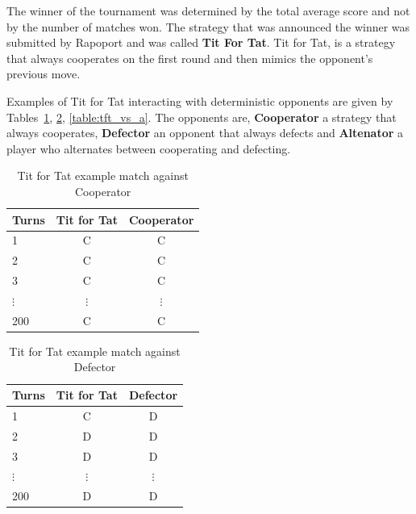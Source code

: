 \documentclass{article}
\begin{document}
The winner of the tournament was determined by the total average score and not by
the number of matches won. The strategy that was announced the winner was
submitted by Rapoport and was called \textbf{Tit For Tat}. Tit for Tat, is a 
strategy that always cooperates on the first round and then mimics the opponent's
previous move. 

Examples of Tit for Tat interacting with deterministic opponents are given by 
Tables~\ref{table:tft_vs_c}, \ref{table:tft_vs_d}, \ref{table:tft_vs_a}. 
The opponents are, \textbf{Cooperator} a strategy that always cooperates, 
\textbf{Defector} an opponent that always defects and \textbf{Altenator} a 
player who alternates between cooperating and defecting.

\begin{table}[!hbtp]
    \begin{center}
    \begin{tabular}{lcc}
        \toprule
        Turns & Tit for Tat & Cooperator\\
        \toprule
        1 & C & C\\
        2 & C & C\\
        3 & C & C\\
        $\vdots$ & $\vdots$ & $\vdots$ \\
        200 & C & C \\
        \bottomrule
    \end{tabular}
    \caption{Tit for Tat example match against Cooperator}\label{table:tft_vs_c}
    \end{center}
\end{table}

\begin{table}[!hbtp]
    \begin{center}
    \begin{tabular}{lcc}
        \toprule
        Turns & Tit for Tat & Defector\\
        \toprule
        1 & C & D\\
        2 & D & D\\
        3 & D & D\\ 
        $\vdots$ & $\vdots$ & $\vdots$ \\ 
        200 & D & D \\
        \bottomrule
    \end{tabular}
    \caption{Tit for Tat example match against Defector}\label{table:tft_vs_d}
\end{center}
\end{table}
\end{document}
